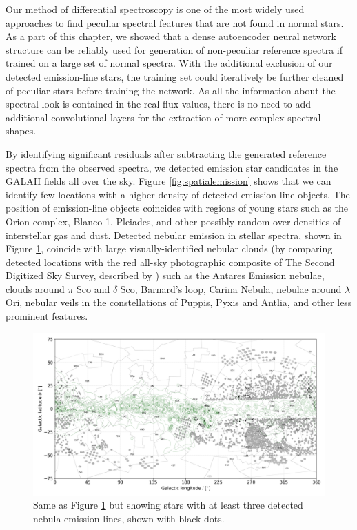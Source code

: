 Our method of differential spectroscopy is one of the most widely used approaches to find peculiar spectral features that are not found in normal stars. As a part of this chapter, we showed that a dense autoencoder neural network structure can be reliably used for generation of non-peculiar reference spectra if trained on a large set of normal spectra. With the additional exclusion of our detected emission-line stars, the training set could iteratively be further cleaned of peculiar stars before training the network. As all the information about the spectral look is contained in the real flux values, there is no need to add additional convolutional layers for the extraction of more complex spectral shapes. 

By identifying significant residuals after subtracting the generated reference spectra from the observed spectra, we detected emission star candidates in the GALAH fields all over the sky. Figure \ref{fig:spatialemission} shows that we can identify few locations with a higher density of detected emission-line objects. The position of emission-line objects coincides with regions of young stars such as the Orion complex, Blanco 1, Pleiades, and other possibly random over-densities of interstellar gas and dust. Detected nebular emission in stellar spectra, shown in Figure \ref{fig:spatialnebular}, coincide with large visually-identified nebular clouds (by comparing detected locations with the red all-sky photographic composite of The Second Digitized Sky Survey, described by \citet{2000ASPC..216..145M}) such as the Antares Emission nebulae, clouds around $\pi$ Sco and $\delta$ Sco, Barnard's loop, Carina Nebula, nebulae around $\lambda$ Ori, nebular veils in the constellations of Puppis, Pyxis and Antlia, and other less prominent features.

\begin{figure}
	\centering
	\includegraphics[width=\textwidth]{reddening_d2000_n720_cont_wnebular.png}
	\caption{Same as Figure \ref{fig:spatialnebular} but showing stars with at least three detected nebula emission lines, shown with black dots.}
	\label{fig:spatialnebular}
\end{figure}

